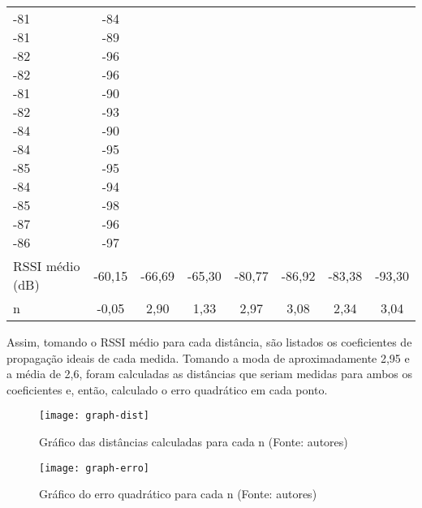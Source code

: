 \begin{table}[ht]
\begin{tabular}{l|ccccccc}
\makecell{-81 \\ -81 \\ -82 \\ -82 \\ -81 \\ -82 \\ -84 \\ -84 \\ -85 \\ -84 \\ -85 \\ -87 \\ -86} &
\makecell{-84 \\ -89 \\ -96 \\ -96 \\ -90 \\ -93 \\ -90 \\ -95 \\ -95 \\ -94 \\ -98 \\ -96 \\ -97}
\vspace{0.4cm}\\

RSSI médio (dB) & -60,15 & -66,69 & -65,30 & -80,77 & -86,92 & -83,38 & -93,30
\vspace{0.4cm}\\

n & -0,05 & 2,90 & 1,33 & 2,97 & 3,08 & 2,34 & 3,04
\end{tabular}
\end{table}

Assim, tomando o RSSI médio para cada distância, são listados os coeficientes de propagação ideais de cada medida. Tomando a moda de aproximadamente 2,95 e a média de 2,6, foram calculadas as distâncias que seriam medidas para ambos os coeficientes e, então, calculado o erro quadrático em cada ponto.

\begin{figure}[ht]
  \centering
    \texttt{[image: graph-dist]}
  \caption{Gráfico das distâncias calculadas para cada n (Fonte: autores)}
\end{figure}

\begin{figure}[ht]
  \centering
    \texttt{[image: graph-erro]}
  \caption{Gráfico do erro quadrático para cada n (Fonte: autores)}
\end{figure}

